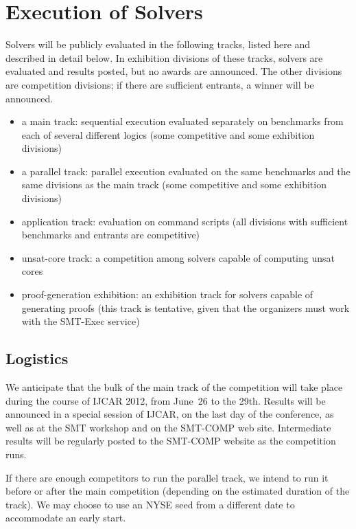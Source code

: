 \documentclass[12pt]{article}
\begin{document}
\section{Execution of Solvers}
\label{sec:exec}

Solvers will be publicly evaluated in the following tracks, listed here and 
described in detail below. In exhibition divisions of these tracks, solvers are evaluated and results posted, but no awards are announced. The other divisions are competition divisions; if there are sufficient entrants, a winner will be announced.
\begin{itemize}
\item a main track: sequential execution evaluated separately on benchmarks from each of several different logics (some competitive and some exhibition divisions)
\item a parallel track: parallel execution evaluated on the same benchmarks and the same divisions as the main track (some competitive and some exhibition divisions)
\item application track: evaluation on command scripts (all divisions with sufficient benchmarks and entrants are competitive)
\item unsat-core track: a competition among solvers capable of computing unsat cores
\item proof-generation exhibition: an exhibition track for solvers capable of generating proofs (this track is tentative, given that the organizers must work with the SMT-Exec service)
\end{itemize}

\subsection{Logistics}

%
We anticipate that the bulk of the main track of the competition will take place during
the course of IJCAR 2012, from June~26 to the 29th.  Results will be
announced in a special session of IJCAR, on the last day of the
conference, as well as at the SMT workshop and on the SMT-COMP web site.  Intermediate results
will be regularly posted to the SMT-COMP website as the competition
runs.

If there are enough competitors to run the parallel track, we intend
to run it before or after the main competition (depending on the
estimated duration of the track). We may choose to use an NYSE seed from a different date
to accommodate an early start.
\end{document}
